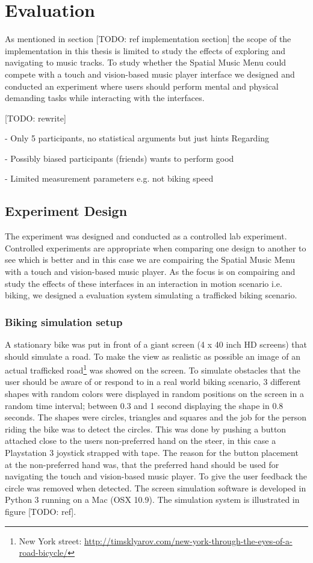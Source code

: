 \chapter{Evaluation}
As mentioned in section [TODO: ref implementation section] the scope of the implementation in this thesis is limited to study the effects of exploring and navigating to music tracks. To study whether the Spatial Music Menu could compete with a touch and vision-based music player interface we designed and conducted an experiment where users should perform mental and physical demanding tasks while interacting with the interfaces.

[TODO: rewrite]

- Only 5 participants, no statistical arguments but just hints
Regarding

- Possibly biased participants (friends) wants to perform good

- Limited measurement parameters e.g. not biking speed


\section{Experiment Design}
The experiment was designed and conducted as a controlled lab experiment. Controlled experiments are appropriate when comparing one design to another to see which is better \cite{benyon_designing_2010} and in this case we are compairing the Spatial Music Menu with a touch and vision-based music player. As the focus is on compairing and study the effects of these interfaces in an interaction in motion scenario i.e. biking, we designed a evaluation system simulating a trafficked biking scenario.

\subsection{Biking simulation setup}
A stationary bike was put in front of a giant screen (4 x 40 inch HD screens) that should simulate a road. To make the view as realistic as possible an image of an actual trafficked road\footnote{New York street: \url{http://timsklyarov.com/new-york-through-the-eyes-of-a-road-bicycle/}} was showed on the screen. To simulate obstacles that the user should be aware of or respond to in a real world biking scenario, 3 different shapes with random colors were displayed in random positions on the screen in a random time interval; between 0.3 and 1 second displaying the shape in 0.8 seconds. The shapes were circles, triangles and squares and the job for the person riding the bike was to detect the circles. This was done by pushing a button attached close to the users non-preferred hand on the steer, in this case a Playstation 3 joystick strapped with tape. The reason for the button placement at the non-preferred hand was, that the preferred hand should be used for navigating the touch and vision-based music player. To give the user feedback the circle was removed when detected. The screen simulation software is developed in Python 3 running on a Mac (OSX 10.9). The simulation system is illustrated in figure [TODO: ref].

